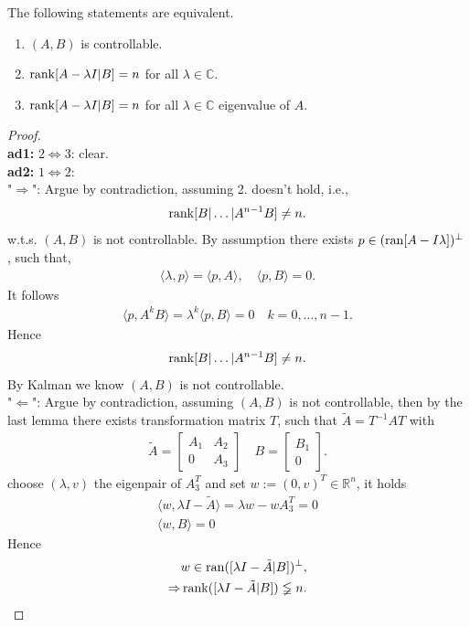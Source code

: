 \begin{theorem}
	The following statements are equivalent. 
	\begin{enumerate}
		\item $(A, B)$ is controllable.
		\item $\operatorname*{rank}[A - \lambda I | B] = n $ for all $\lambda \in \mathbb{C}$.
		\item $\operatorname*{rank}[A - \lambda I | B] = n $ for all $\lambda \in \mathbb{C}$ eigenvalue of $A$. 
	\end{enumerate}
\end{theorem}
\begin{proof}
\quad\\
\textbf{ad1:} $2 \Leftrightarrow 3$: clear. \\
\textbf{ad2:} $1 \Leftrightarrow 2$: \\
"$\Rightarrow$": Argue by contradiction, assuming 2. doesn't hold, i.e., 
\begin{align*}
	\operatorname*{rank}[B|\dots|A^{n -1}B] \neq n.
\end{align*}
w.t.s. $(A, B)$ is not controllable. 
By assumption there exists $p \in (\operatorname{ran}[A - I\lambda])^\perp $, such that, 
\begin{align*}
	\langle \lambda , p \rangle = \langle p, A \rangle , \quad \langle p, B \rangle = 0. 
\end{align*}
It follows
\begin{align*}
	\langle p, A^{k}B \rangle = \lambda^k \langle p, B\rangle =  0 \quad k = 0, \dots, n - 1. 
\end{align*}
Hence
\begin{align*}
	\operatorname*{rank} [B|\dots|A^{n -1}B] \neq n.
\end{align*}
By Kalman we know $(A, B)$ is not controllable. 
 \\
"$\Leftarrow$":  Argue by contradiction, assuming $(A, B)$ is not controllable, then by the last lemma there exists transformation matrix $T$, such that $\tilde{A} = T^{-1} A T$ with 
\begin{align*}
	\tilde{A} = 
	\begin{bmatrix}
		A_1 & A_2\\
		0 & A_3
	\end{bmatrix}
	\quad 
	B = 
	\begin{bmatrix}
		B_1\\
		0
	\end{bmatrix}.
\end{align*} 
choose $(\lambda, v)$ the eigenpair of $A_3^T$ and set $w:= (0, v)^T \in \mathbb{R}^n$, it holds
\begin{align*}
	\langle w, \lambda I - \tilde{A} \rangle  = \lambda w - w A_3^T = 0\\
	\langle w, B \rangle = 0  
\end{align*}
Hence
\begin{align*}
	&w \in \operatorname{ran} ([\lambda I - \tilde{A}|B])^\perp, \\
	\Rightarrow & \operatorname*{rank} ([\lambda I - \tilde{A}|B]) \lneqq n . 
\end{align*}
\end{proof}





